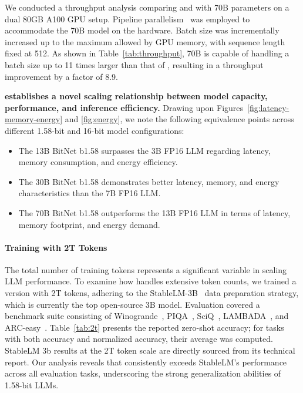 We conducted a throughput analysis comparing  and  with 70B parameters on a dual 80GB A100 GPU setup. Pipeline parallelism~\cite{gpipe} was employed to accommodate the  70B model on the hardware. Batch size was incrementally increased up to the maximum allowed by GPU memory, with sequence length fixed at 512. As shown in Table~\ref{tab:throughput},  70B is capable of handling a batch size up to 11 times larger than that of , resulting in a throughput improvement by a factor of 8.9.

\textbf{ establishes a novel scaling relationship between model capacity, performance, and inference efficiency.} Drawing upon Figures~\ref{fig:latency-memory-energy} and \ref{fig:energy}, we note the following equivalence points across different 1.58-bit and 16-bit model configurations:

\begin{itemize}
    \item The 13B BitNet b1.58 surpasses the 3B FP16 LLM regarding latency, memory consumption, and energy efficiency.
    \item The 30B BitNet b1.58 demonstrates better latency, memory, and energy characteristics than the 7B FP16 LLM.
    \item The 70B BitNet b1.58 outperforms the 13B FP16 LLM in terms of latency, memory footprint, and energy demand.
\end{itemize}

\paragraph{Training with 2T Tokens}

The total number of training tokens represents a significant variable in scaling LLM performance. To examine how  handles extensive token counts, we trained a version with 2T tokens, adhering to the StableLM-3B~\cite{StableLM-3B-4E1T} data preparation strategy, which is currently the top open-source 3B model. Evaluation covered a benchmark suite consisting of Winogrande~\cite{winoGrande}, PIQA~\cite{piqa}, SciQ~\cite{sciq}, LAMBADA~\cite{lambada}, and ARC-easy~\cite{arc}. Table~\ref{tab:2t} presents the reported zero-shot accuracy; for tasks with both accuracy and normalized accuracy, their average was computed. StableLM 3b results at the 2T token scale are directly sourced from its technical report. Our analysis reveals that  consistently exceeds StableLM’s performance across all evaluation tasks, underscoring the strong generalization abilities of 1.58-bit LLMs.

